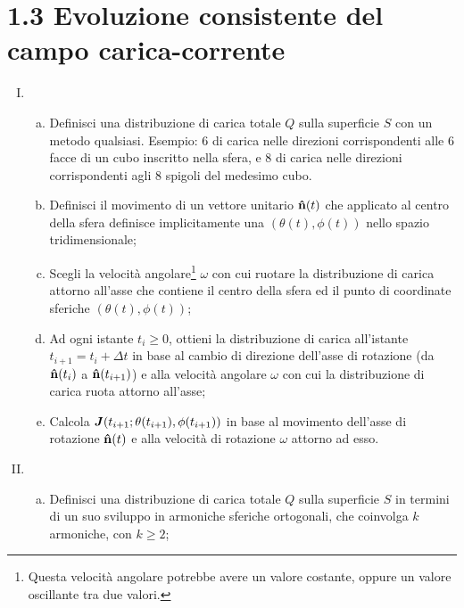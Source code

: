 \section*{1.3 Evoluzione consistente del campo carica-corrente}\label{sec_1.3}
\begin{enumerate}[(I)]
\item {}  
	\begin{enumerate}[(a)]
	\item Definisci una distribuzione di carica totale $Q$ sulla superficie $S$ con un metodo qualsiasi. Esempio: 6  di carica  nelle direzioni corrispondenti alle 6 facce di un cubo inscritto nella sfera, e 8  di carica  nelle direzioni corrispondenti agli 8 spigoli del medesimo cubo.  
	\item Definisci il movimento di un vettore unitario $\vu{n}(t)$ che applicato al centro della sfera definisce implicitamente una  $(\theta(t), \phi(t))$ nello spazio tridimensionale; 
	\item Scegli la velocità angolare\footnote{Questa velocità angolare potrebbe avere un valore costante, oppure un valore oscillante tra due valori.} $\omega$ con cui ruotare la distribuzione di carica attorno all'asse che contiene il centro della sfera ed il punto di coordinate sferiche 
$(\theta(t), \phi(t))$;
	\item Ad ogni istante $t_i \geq 0$, ottieni la distribuzione di carica all'istante $t_{i+1} = t_i + \Delta t$ in base al cambio di direzione dell'asse di rotazione (da $\vu{n}(t_i)$ a $\vu{n}(t_{i+1})$) e alla velocità angolare $\omega$ con cui la distribuzione di carica ruota attorno all'asse;
	\item Calcola $\vb*{J}(t_{i+1}; \theta(t_{i+1}), \phi(t_{i+1}) )$  in base al movimento dell'asse di rotazione $\vu{n}(t)$ e alla velocità di rotazione $\omega$ attorno ad esso.
	\end{enumerate}
\item {} 
	\begin{enumerate}[(a)]
	\item Definisci una distribuzione di carica totale $Q$ sulla superficie $S$ in termini di un  suo sviluppo in armoniche sferiche ortogonali, che coinvolga $k$ armoniche, con $k \geq 2$;  

\end{enumerate}
\end{enumerate}
